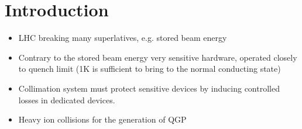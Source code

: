 \chapter{Introduction}


\begin{itemize}
\item LHC breaking many superlatives, e.g. stored beam energy 
\item Contrary to the stored beam energy very sensitive hardware, operated closely to quench limit (1K is sufficient to bring to the normal conducting state)
\item Collimation system must protect sensitive devices by inducing controlled losses in dedicated devices.
\item Heavy ion collisions for the generation of QGP
\end{itemize}








